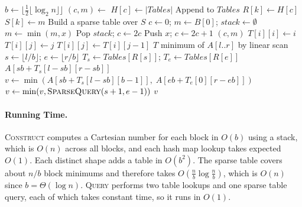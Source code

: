 \documentclass{article}
\theoremstyle{definition}
\begin{document}
\begin{algorithm}[H]
\caption{Fischer--Heun}
\label{alg:Fischer--Heun}
\begin{algorithmic}[1]
    \State $b \gets \lfloor \frac{1}{2} \lfloor \log_2 n \rfloor \rfloor$
     \Return {}
    \EndIf
        \State $(c, m) \gets$ 
            \State $H[c] \gets |\mathit{Tables}|$
            \State Append  to $\mathit{Tables}$
        \EndIf
        \State $R[k] \gets H[c]$
        \State $S[k] \gets m$
    \EndFor
    \State Build a sparse table over $S$
\EndFunction
\Statex
{}
    \State $c \gets 0$; $m \gets B[0]$; $\mathit{stack} \gets \emptyset$
        \State $m \gets \min(m, x)$
            \State Pop $\mathit{stack}$; $c \gets 2c$
        \EndWhile
        \State Push $x$; $c \gets 2c + 1$
    \EndFor
    \State \Return $(c, m)$
\EndFunction
\Statex
{}
        \State $T[i][i] \gets i$
                \State $T[i][j] \gets j$
            \Else
                \State $T[i][j] \gets T[i][j - 1]$
            \EndIf
        \EndFor
    \EndFor
    \State \Return $T$
\EndFunction
\Statex
{}
     \Return minimum of $A[l..r]$ by linear scan
    \EndIf
    \State $s \gets \lfloor l / b \rfloor$; $e \gets \lfloor r / b \rfloor$
    \State $T_s \gets \mathit{Tables}[R[s]]$; $T_e \gets \mathit{Tables}[R[e]]$
        \State \Return $A[sb + T_s[l - sb][r - sb]]$
    \EndIf
    \State $v \gets \min(A[sb + T_s[l - sb][b - 1]],\; A[eb + T_e[0][r - eb]])$
        \State $v \gets \min(v, \textsc{SparseQuery}(s + 1, e - 1))$
    \EndIf
    \State \Return $v$
\EndFunction
\end{algorithmic}
\end{algorithm}

\paragraph{Running Time.}
\textsc{Construct} computes a Cartesian number for each block in $O(b)$ using a stack, which is $O(n)$ across all blocks, and each hash map lookup takes expected $O(1)$. Each distinct shape adds a table in $O(b^2)$. The sparse table covers about $n/b$ block minimums and therefore takes $O(\frac{n}{b} \log \frac{n}{b})$, which is $O(n)$ since $b = \Theta(\log n)$. \textsc{Query} performs two table lookups and one sparse table query, each of which takes constant time, so it runs in $O(1)$.
\end{document}
